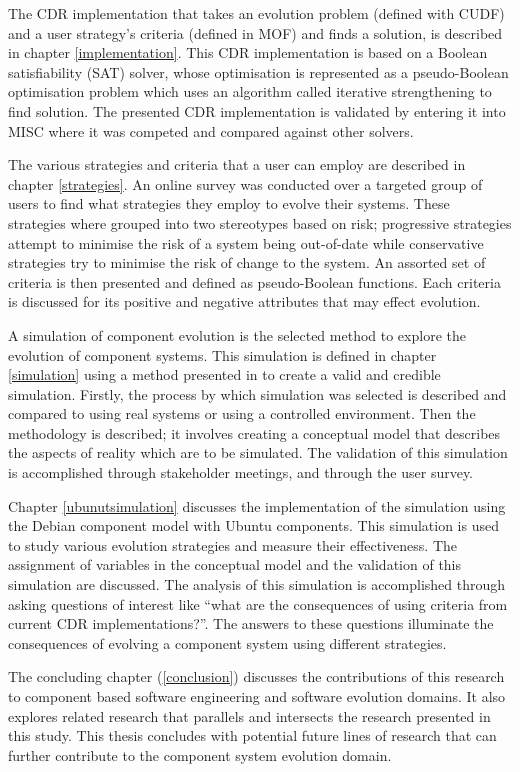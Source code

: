 The CDR implementation that takes an evolution problem (defined with CUDF) and a user strategy's criteria (defined in MOF) and finds a solution, is described in chapter \ref{implementation}.
This CDR implementation is based on a Boolean satisfiability (SAT) solver, 
whose optimisation is represented as a pseudo-Boolean optimisation problem which uses an algorithm called iterative strengthening to find solution.
The presented CDR implementation is validated by entering it into MISC where it was competed and compared against other solvers.

The various strategies and criteria that a user can employ are described in chapter \ref{strategies}.
An online survey was conducted over a targeted group of users to find what strategies they employ to evolve their systems.
These strategies where grouped into two stereotypes based on risk;
progressive strategies attempt to minimise the risk of a system being out-of-date while conservative strategies try to minimise the risk of change to the system.
An assorted set of criteria is then presented and defined as pseudo-Boolean functions.
Each criteria is discussed for its positive and negative attributes that may effect evolution.

A simulation of component evolution is the selected method to explore the evolution of component systems.
This simulation is defined in chapter \ref{simulation} using a method presented in \cite{Law2005} to create a valid and credible simulation.
Firstly, the process by which simulation was selected is described and compared to using real systems or using a controlled environment.
Then the methodology is described; it involves creating a conceptual model that describes the aspects of reality which are to be simulated.
The validation of this simulation is accomplished through stakeholder meetings, and through the user survey.

Chapter \ref{ubunutsimulation} discusses the implementation of the simulation using the Debian component model \citep{Barth2005} with Ubuntu \citep{Hill2006} components. 
This simulation is used to study various evolution strategies and measure their effectiveness.
The assignment of variables in the conceptual model and the validation of this simulation are discussed.
The analysis of this simulation is accomplished through asking questions of interest like ``what are the consequences of using criteria from current CDR implementations?''.
The answers to these questions illuminate the consequences of evolving a component system using different strategies.

The concluding chapter (\ref{conclusion}) discusses the contributions of this research to component based software engineering and software evolution domains.
It also explores related research that parallels and intersects the research presented in this study.
This thesis concludes with potential future lines of research that can further contribute to the component system evolution domain. 